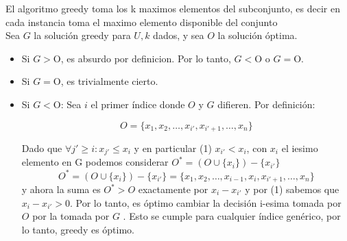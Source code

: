 \documentclass{article}
\begin{document}
El algoritmo greedy toma los k maximos elementos del subconjunto, es decir en cada instancia toma el maximo elemento disponible del conjunto \\
Sea \(G\) la solución greedy para \( U, k \) dados, y sea \( O \) la solución óptima.


\begin{itemize}
    \item Si \( G > \text{O} \), es absurdo por definicion. Por lo tanto, \( G < \text{O} \) o \( G = \text{O} \).
    
    \item Si \( G = \text{O} \), es trivialmente cierto.
    
    \item Si \( G < \text{O} \): Sea \( i \) el primer índice donde \( O \) y \( G \) difieren. Por definición:
    
    \[ O = \{x_1, x_2, \dots, x_{i'}, x_{i' + 1}, \dots, x_n\} \]
    
    Dado que \( \forall {j'} \geq i: x_{j'} \leq x_i \) y  en particular (1) \( x_{i'} < x_i \), con \(x_i\) el iesimo elemento en G podemos considerar \( O^* = (O \cup \{x_i\}) - \{x_{i'}\} \)
		 \[ O^* = (O \cup \{x_i\}) - \{x_{i'}\} = \{x_1, x_2, \dots, x_{i-1}, x_i, x_{i' + 1}, \dots, x_n\} \]    
     y ahora la suma es \(  O^* >  O \) exactamente por \( x_i - x_{i'} \) y por (1) sabemos que \( x_i - x_{i'} > 0 \). Por lo tanto, es óptimo cambiar la decisión  i-esima tomada por \( O \) por la tomada por \( G \) . Esto se cumple para cualquier índice genérico, por lo tanto, greedy es óptimo.
    
    
\end{itemize}
\end{document}
